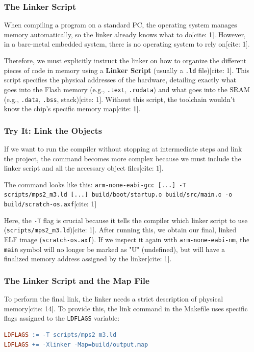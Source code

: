 \subsubsection{The Linker Script}
When compiling a program on a standard PC, the operating system manages memory automatically, so the linker already knows what to do[cite: 1]. However, in a bare-metal embedded system, there is no operating system to rely on[cite: 1]. 

Therefore, we must explicitly instruct the linker on how to organize the different pieces of code in memory using a \textbf{Linker Script} (usually a \texttt{.ld} file)[cite: 1]. This script specifies the physical addresses of the hardware, detailing exactly what goes into the Flash memory (e.g., \texttt{.text}, \texttt{.rodata}) and what goes into the SRAM (e.g., \texttt{.data}, \texttt{.bss}, stack)[cite: 1]. Without this script, the toolchain wouldn't know the chip's specific memory map[cite: 1].

\subsubsection{Try It: Link the Objects}
If we want to run the compiler without stopping at intermediate steps and link the project, the command becomes more complex because we must include the linker script and all the necessary object files[cite: 1]. 

The command looks like this:
\texttt{arm-none-eabi-gcc [...] -T scripts/mps2\_m3.ld [...] build/boot/startup.o build/src/main.o -o build/scratch-os.axf}[cite: 1]

Here, the \texttt{-T} flag is crucial because it tells the compiler which linker script to use (\texttt{scripts/mps2\_m3.ld})[cite: 1]. After running this, we obtain our final, linked ELF image (\texttt{scratch-os.axf}). If we inspect it again with \texttt{arm-none-eabi-nm}, the \texttt{main} symbol will no longer be marked as "U" (undefined), but will have a finalized memory address assigned by the linker[cite: 1].


\subsubsection{The Linker Script and the Map File}
To perform the final link, the linker needs a strict description of physical memory[cite: 14]. To provide this, the link command in the Makefile uses specific flags assigned to the \texttt{LDFLAGS} variable:

\begin{lstlisting}[language=make]
LDFLAGS := -T scripts/mps2_m3.ld
LDFLAGS += -Xlinker -Map=build/output.map
\end{lstlisting}

